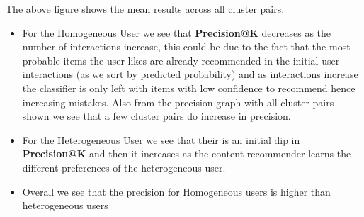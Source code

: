 \documentclass[a4paper,fontsize=8.0pt]{scrartcl}
\begin{document}
\begin{flushleft}
The above figure shows the mean results across all cluster pairs.
\begin{itemize}
    \item For the Homogeneous User we see that \textbf{Precision@K} decreases as the number of interactions increase, this could be due to the fact that the most probable items the user likes are already recommended in the initial user-interactions (as we sort by predicted probability) and as interactions increase the classifier is only left with items with low confidence to recommend hence increasing mistakes. Also from the precision graph with all cluster pairs shown we see that a few cluster pairs do increase in precision.
    \item For the Heterogeneous User we see that their is an initial dip in \textbf{Precision@K} and then it increases as the content recommender learns the different preferences of the heterogeneous user.
    \item Overall we see that the precision for Homogeneous users is higher than heterogeneous users
\end{itemize}
\end{flushleft}
\vspace{-3ex}
\end{document}

